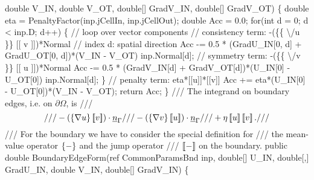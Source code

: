 {\btab \btab double V\_IN, double V\_OT, double[] GradV\_IN, double[] GradV\_OT) \{\newline 
 \newline 
\btab \btab double eta = PenaltyFactor(inp.jCellIn, inp.jCellOut);\newline 
 \newline 
\btab \btab double Acc = 0.0;\newline 
\btab \btab for(int d = 0; d < inp.D; d++) \{ // loop over vector components \newline 
\btab \btab \btab // consistency term: -(\{\{ \textbackslash /u \}\} [[ v ]])*Normal\newline 
\btab \btab \btab // index d: spatial direction\newline 
\btab \btab \btab Acc -= 0.5 * (GradU\_IN[0, d] + GradU\_OT[0, d])*(V\_IN - V\_OT)\newline 
\btab \btab \btab \btab \btab    * inp.Normal[d];\newline 
 \newline 
\btab \btab \btab // symmetry term: -(\{\{ \textbackslash /v \}\} [[ u ]])*Normal\newline 
\btab \btab \btab Acc -= 0.5 * (GradV\_IN[d] + GradV\_OT[d])*(U\_IN[0] - U\_OT[0])\newline 
\btab \btab \btab \btab \btab    * inp.Normal[d];\newline 
\btab \btab \}\newline 
 \newline 
\btab \btab // penalty term: eta*[[u]]*[[v]]\newline 
\btab \btab Acc += eta*(U\_IN[0] - U\_OT[0])*(V\_IN - V\_OT);\newline 
\btab \btab return Acc;\newline 
\btab \} \newline 
    /// The integrand on boundary edges, i.e. on $\partial \Omega$, is
    /// \[ 
    ///   -( \mean{ \nabla u } \jump{ v }) \cdot \vec{n}_{\Gamma} 
    ///   -( \mean{ \nabla v } \jump{ u }) \cdot \vec{n}_{\Gamma} 
    ///   +  \eta \jump{ u }  \jump{v} .
    /// \]
    /// For the boundary we have to consider the special definition for 
    /// the mean-value operator $\left\{{-}\right\}$ and the jump operator 
    /// $\left[\!\left[{-}\right]\!\right]$ on the boundary.
\btab public double BoundaryEdgeForm(ref CommonParamsBnd inp, \newline 
\btab \btab double[] U\_IN, double[,] GradU\_IN, double V\_IN, double[] GradV\_IN) \{\newline 
 \newline 
}
